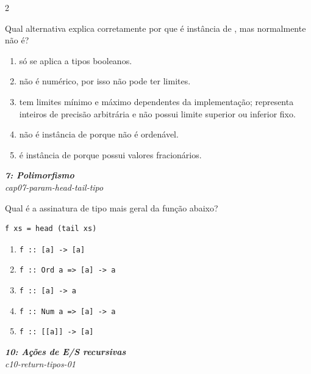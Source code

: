 \documentclass[a4paper,10pt,brazil]{article}
\begin{document}
\begin{multicols}{2}
\begin{flushright}
\end{flushright}
Qual alternativa explica corretamente por que  é instância de , mas  normalmente não é?
\begin{enumerate}
  \item {} só se aplica a tipos booleanos.
  \item {} não é numérico, por isso não pode ter limites.
  \item {} tem limites mínimo e máximo dependentes da implementação;  representa inteiros de precisão arbitrária e não possui limite superior ou inferior fixo.
  \item {} não é instância de  porque não é ordenável.
  \item {} é instância de  porque possui valores fracionários.

\end{enumerate}

\begin{flushright}
  \footnotesize
  \textit{\textbf{7: Polimorfismo}}\\
  \textit{cap07-param-head-tail-tipo}\\

\end{flushright}
Qual é a assinatura de tipo mais geral da função abaixo?

\begin{verbatim}
f xs = head (tail xs)
\end{verbatim}

\begin{enumerate}
  \item \texttt{f :: [a] -> [a]}
  \item \texttt{f :: Ord a => [a] -> a}
  \item \texttt{f :: [a] -> a}
  \item \texttt{f :: Num a => [a] -> a}
  \item \texttt{f :: [[a]] -> [a]}

\end{enumerate}

\begin{flushright}
  \footnotesize
  \textit{\textbf{10: Ações de E/S recursivas}}\\
  \textit{c10-return-tipos-01}\\


\end{flushright}
\end{multicols}
\end{document}
